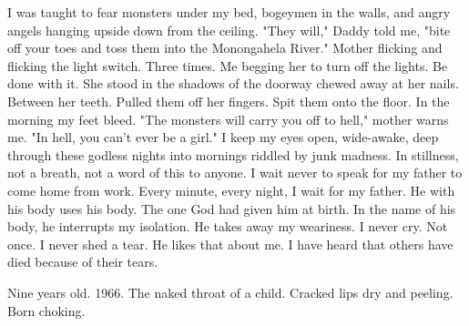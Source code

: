 \documentclass[
]{memoir}
\begin{document}
I was taught to fear monsters under my bed, bogeymen in the walls, and
angry angels hanging upside down from the ceiling. "They will," Daddy
told me, "bite off your toes and toss them into the Monongahela River."
Mother flicking and flicking the light switch. Three times. Me begging
her to turn off the lights. Be done with it. She stood in the shadows of
the doorway chewed away at her nails. Between her teeth. Pulled them off
her fingers. Spit them onto the floor. In the morning my feet bleed.
"The monsters will carry you off to hell," mother warns me. "In hell,
you can't ever be a girl." I keep my eyes open, wide-awake, deep through
these godless nights into mornings riddled by junk madness. In
stillness, not a breath, not a word of this to anyone. I wait never to
speak for my father to come home from work. Every minute, every night, I
wait for my father. He with his body uses his body. The one God had
given him at birth. In the name of his body, he interrupts my isolation.
He takes away my weariness. I never cry. Not once. I never shed a tear.
He likes that about me. I have heard that others have died because of
their tears.

Nine years old. 1966. The naked throat of a child. Cracked lips dry and
peeling. Born choking.
\end{document}
